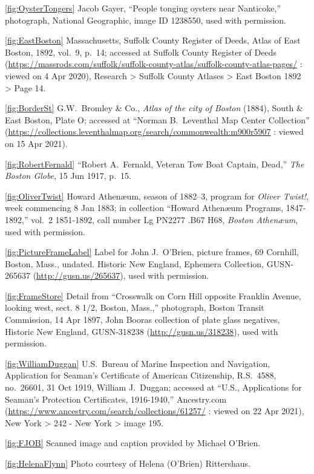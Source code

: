 \ref{fig:OysterTongers} Jacob Gayer, ``People tonging oysters near Nanticoke,'' photograph, National Geographic, image ID 1238550, used with permission.

\ref{fig:EastBoston} Massachusetts, Suffolk County Register of Deeds, Atlas of East Boston, 1892, vol.\ 9, p.\ 14; accessed at Suffolk County Register of Deeds (\url{https://massrods.com/suffolk/suffolk-county-atlas/suffolk-county-atlas-pages/} : viewed on 4 Apr 2020), Research > Suffolk County Atlases > East Boston 1892 > Page 14.

\ref{fig:BorderSt} G.W.\ Bromley \& Co., \textit{Atlas of the city of Boston} (1884), South \& East Boston, Plate O; accessed at ``Norman B.\ Leventhal Map Center Collection'' (\url{https://collections.leventhalmap.org/search/commonwealth:m900r5907} : viewed on 15 Apr 2021).

\ref{fig:RobertFernald} ``Robert A.\ Fernald, Veteran Tow Boat Captain, Dead,'' \textit{The Boston Globe}, 15 Jun 1917, p.\ 15.

\ref{fig:OliverTwist}
Howard Athen\ae um, season of 1882--3, program for \textit{Oliver Twist!}, week commencing 8 Jan 1883; in collection ``Howard Athen\ae um Programs, 1847-1892,'' vol.\ 2 1851-1892, call number Lg PN2277 .B67 H68, \textit{Boston Athen\ae um}, used with permission.

\ref{fig:PictureFrameLabel} Label for John J.\ O'Brien, picture frames, 69 Cornhill, Boston, Mass., undated. Historic New England, Ephemera Collection, GUSN-265637 (\url{http://gusn.us/265637}), used with permission.

\ref{fig:FrameStore} Detail from ``Crosswalk on Corn Hill opposite Franklin Avenue, looking west, sect. 8 1/2, Boston, Mass.,'' photograph, Boston Transit Commission, 14 Apr 1897, John Booras collection of plate glass negatives, Historic New England, GUSN-318238 (\url{http://gusn.us/318238}), used with permission. 

\ref{fig:WilliamDuggan} U.S.\ Bureau of Marine Inspection and Navigation, Application for Seaman's Certificate of American Citizenship, R.S.\ 4588, no.\ 26601, 31 Oct 1919, William J.\ Duggan; accessed at ``U.S., Applications for Seaman's Protection Certificates, 1916-1940,'' Ancestry.com (\url{https://www.ancestry.com/search/collections/61257/} : viewed on 22 Apr 2021), New York > 242 - New York > image 195.

\ref{fig:FJOB} Scanned image and caption provided by Michael O'Brien.

\ref{fig:HelenaFlynn} Photo courtesy of Helena (O'Brien) Rittershaus.

